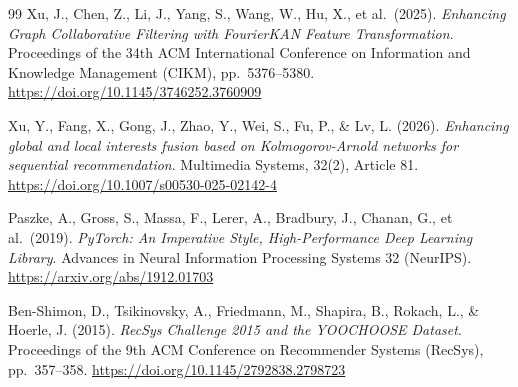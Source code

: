 \documentclass[12pt,a4paper]{report}
\begin{document}
\begin{thebibliography}{99}
Xu, J., Chen, Z., Li, J., Yang, S., Wang, W., Hu, X., et al.\ (2025).
\textit{Enhancing Graph Collaborative Filtering with FourierKAN Feature Transformation}.
Proceedings of the 34th ACM International Conference on Information and Knowledge Management (CIKM), pp.\ 5376--5380. \url{https://doi.org/10.1145/3746252.3760909}

Xu, Y., Fang, X., Gong, J., Zhao, Y., Wei, S., Fu, P., \& Lv, L. (2026).
\textit{Enhancing global and local interests fusion based on Kolmogorov-Arnold networks for sequential recommendation}.
Multimedia Systems, 32(2), Article 81. \url{https://doi.org/10.1007/s00530-025-02142-4}

Paszke, A., Gross, S., Massa, F., Lerer, A., Bradbury, J., Chanan, G., et al.\ (2019).
\textit{PyTorch: An Imperative Style, High-Performance Deep Learning Library}.
Advances in Neural Information Processing Systems 32 (NeurIPS). \url{https://arxiv.org/abs/1912.01703}

Ben-Shimon, D., Tsikinovsky, A., Friedmann, M., Shapira, B., Rokach, L., \& Hoerle, J. (2015).
\textit{RecSys Challenge 2015 and the YOOCHOOSE Dataset}.
Proceedings of the 9th ACM Conference on Recommender Systems (RecSys), pp.\ 357--358. \url{https://doi.org/10.1145/2792838.2798723}

\end{thebibliography}
\end{document}
